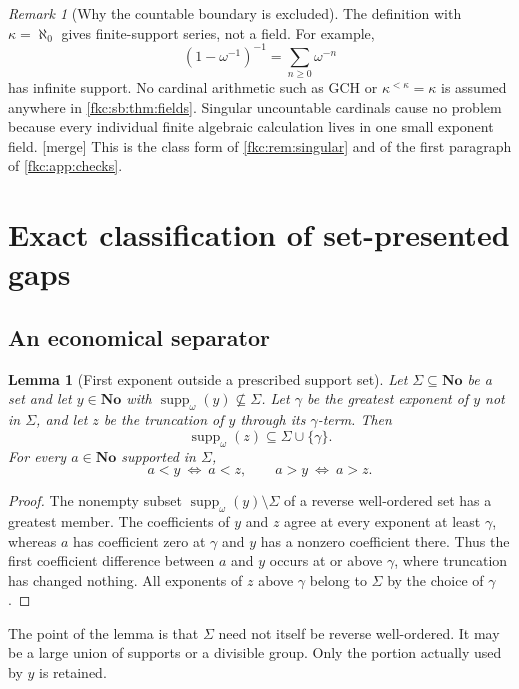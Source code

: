 \documentclass[11pt,letterpaper]{article}
\numberwithin{equation}{section}
\newtheorem{lemma}[theorem]{Lemma}
\theoremstyle{definition}
\theoremstyle{remark}
\newtheorem{remark}[theorem]{Remark}
\newcommand{\No}{\mathbf{No}}
\newcommand{\mergetag}{\textup{\textsf{\small[merge]}}}%
\newcommand{\suppw}{\operatorname{supp}_{\omega}}
\begin{document}
\begin{remark}[Why the countable boundary is excluded]\label{fkc:sb:rem:countable}
The definition with $\kappa=\aleph_0$ gives finite-support series, not a field. For example,
\[
 (1-\omega^{-1})^{-1}=\sum_{n\ge0}\omega^{-n}
\]
has infinite support. No cardinal arithmetic such as GCH or $\kappa^{<\kappa}=\kappa$ is assumed anywhere in \cref{fkc:sb:thm:fields}. Singular uncountable cardinals cause no problem because every individual finite algebraic calculation lives in one small exponent field. \mergetag{} This is the class form of \cref{fkc:rem:singular} and of the first paragraph of \cref{fkc:app:checks}.
\end{remark}

\section{Exact classification of set-presented gaps}\label{fkc:sb:sec:gaps}

\subsection{An economical separator}
\begin{lemma}[First exponent outside a prescribed support set]\label{fkc:sb:lem:outside}
Let $\Sigma\subseteq\No$ be a set and let $y\in\No$ with $\suppw(y)\nsubseteq\Sigma$. Let $\gamma$ be the greatest exponent of $y$ not in $\Sigma$, and let $z$ be the truncation of $y$ through its $\gamma$-term. Then
\[
 \suppw(z)\subseteq\Sigma\cup\{\gamma\}.
\]
For every $a\in\No$ supported in $\Sigma$,
\[
 a<y\ \Longleftrightarrow\ a<z,
 \qquad
 a>y\ \Longleftrightarrow\ a>z.
\]
\end{lemma}
\begin{proof}
The nonempty subset $\suppw(y)\setminus\Sigma$ of a reverse well-ordered set has a greatest member. The coefficients of $y$ and $z$ agree at every exponent at least $\gamma$, whereas $a$ has coefficient zero at $\gamma$ and $y$ has a nonzero coefficient there. Thus the first coefficient difference between $a$ and $y$ occurs at or above $\gamma$, where truncation has changed nothing. All exponents of $z$ above $\gamma$ belong to $\Sigma$ by the choice of $\gamma$.
\end{proof}

The point of the lemma is that $\Sigma$ need not itself be reverse well-ordered. It may be a large union of supports or a divisible group. Only the portion actually used by $y$ is retained.
\end{document}
